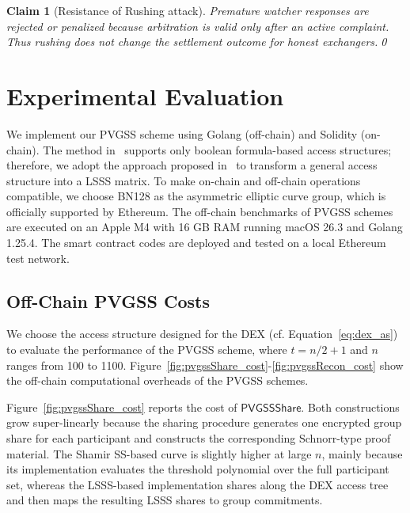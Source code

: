 \documentclass[runningheads]{llncs}
\newtheorem{myClaim}{Claim}
\newcommand{\pvgssShare}{\mathsf{PVGSSShare}}
\begin{document}
\begin{myClaim}[Resistance of Rushing attack]\label{lem:rushing}
Premature watcher responses are rejected or penalized because arbitration is
valid only after an active complaint. Thus rushing does not change the settlement
outcome for honest exchangers.\qed
\end{myClaim}



\section{Experimental Evaluation}
\label{sec:experiments}
\label{sec:dex_experiments}
We implement our PVGSS scheme using Golang (off-chain) and Solidity (on-chain). The method in~\cite{Lewko2011DABE} supports only boolean formula-based access structures; therefore, we adopt the approach proposed in~\cite{Liu2010LSSS} to transform a general access structure into a LSSS matrix. To make on-chain and off-chain operations compatible, we choose BN128 as the asymmetric elliptic curve group, which is officially supported by Ethereum.
The off-chain benchmarks of PVGSS schemes are executed on an Apple M4 with 16 GB RAM running macOS 26.3 and Golang 1.25.4.
The smart contract codes are deployed and tested on a local Ethereum test network.

\subsection{Off-Chain PVGSS Costs}
We choose the access structure designed for the DEX (cf. Equation~\eqref{eq:dex_as}) to evaluate the performance of the PVGSS scheme, where $t=n/2+1$ and $n$ ranges from 100 to 1100. Figure~\ref{fig:pvgssShare_cost}-\ref{fig:pvgssRecon_cost} show the off-chain computational overheads of the PVGSS schemes.

Figure~\ref{fig:pvgssShare_cost} reports the cost of $\pvgssShare$. Both constructions grow super-linearly because the sharing procedure generates one encrypted group share for each participant and constructs the corresponding Schnorr-type proof material. The Shamir SS-based curve is slightly higher at large $n$, mainly because its implementation evaluates the threshold polynomial over the full participant set, whereas the LSSS-based implementation shares along the DEX access tree and then maps the resulting LSSS shares to group commitments.
\end{document}

